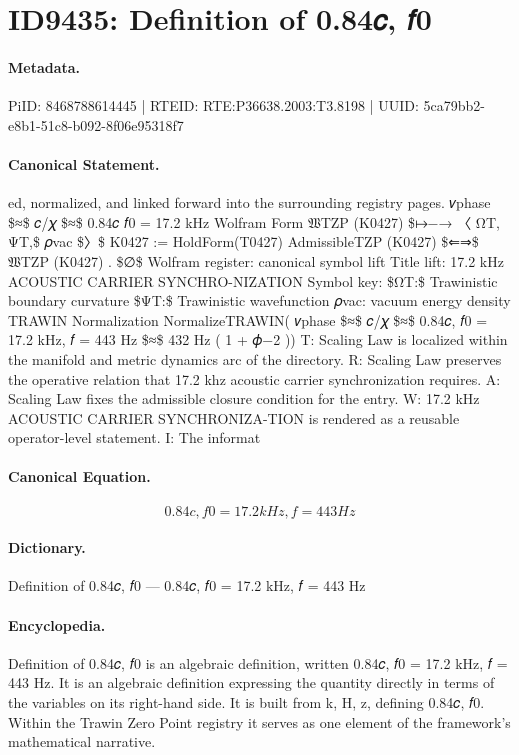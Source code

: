 \section*{ID9435: Definition of 0.84𝑐, 𝑓0}
\paragraph{Metadata.}
PiID: 8468788614445 | RTEID: RTE:P36638.2003:T3.8198 | UUID: 5ca79bb2-e8b1-51c8-b092-8f06e95318f7

\paragraph{Canonical Statement.}
ed, normalized, and linked forward into the surrounding registry pages. 𝑣phase \$≈\$ 𝑐/𝜒 \$≈\$ 0.84𝑐 𝑓0 = 17.2 kHz Wolfram Form 𝔚TZP (K0427) \$↦−→ 〈 ΩT, ΨT,\$ 𝜌vac \$〉\$ K0427 := HoldForm(T0427) AdmissibleTZP (K0427) \$⇐⇒\$ 𝔚TZP (K0427) . \$∅\$ Wolfram register: canonical symbol lift Title lift: 17.2 kHz ACOUSTIC CARRIER SYNCHRO-NIZATION Symbol key: \$ΩT:\$ Trawinistic boundary curvature \$ΨT:\$ Trawinistic wavefunction 𝜌vac: vacuum energy density TRAWIN Normalization NormalizeTRAWIN( 𝑣phase \$≈\$ 𝑐/𝜒 \$≈\$ 0.84𝑐, 𝑓0 = 17.2 kHz, 𝑓 = 443 Hz \$≈\$ 432 Hz ( 1 + 𝜙−2 )) T: Scaling Law is localized within the manifold and metric dynamics arc of the directory. R: Scaling Law preserves the operative relation that 17.2 khz acoustic carrier synchronization requires. A: Scaling Law fixes the admissible closure condition for the entry. W: 17.2 kHz ACOUSTIC CARRIER SYNCHRONIZA-TION is rendered as a reusable operator-level statement. I: The informat

\paragraph{Canonical Equation.}
\[
0.84𝑐, 𝑓0 = 17.2 kHz, 𝑓 = 443 Hz
\]

\paragraph{Dictionary.}
Definition of 0.84𝑐, 𝑓0 — 0.84𝑐, 𝑓0 = 17.2 kHz, 𝑓 = 443 Hz

\paragraph{Encyclopedia.}
Definition of 0.84𝑐, 𝑓0 is an algebraic definition, written 0.84𝑐, 𝑓0 = 17.2 kHz, 𝑓 = 443 Hz. It is an algebraic definition expressing the quantity directly in terms of the variables on its right-hand side. It is built from k, H, z, defining 0.84𝑐, 𝑓0. Within the Trawin Zero Point registry it serves as one element of the framework's mathematical narrative.
